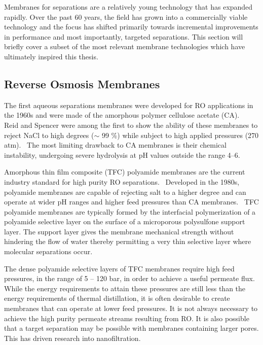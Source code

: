   Membranes for separations are a relatively young technology that has expanded
  rapidly. Over the past 60 years, the field has grown into a commercially viable
  technology and the focus has shifted primarily towards incremental improvements
  in performance and most importantly, targeted separations. This section will 
  briefly cover a subset of the most relevant membrane technologies which have 
  ultimately inspired this thesis.
  
  \subsection{Reverse Osmosis Membranes}
  
  The first aqueous separations membranes were developed for RO applications 
  in the 1960s and were made of the amorphous polymer cellulose acetate (CA).~\cite{kesting_semipermeable_1965}
  Reid and Spencer were among the first to show the ability of these membranes
  to reject NaCl to high degrees ($\sim$ 99 \%) while subject to high applied 
  pressures (270 atm).~\cite{reid_ultrafiltration_1960} The most limiting 
  drawback to CA membranes is their chemical instability, undergoing severe 
  hydrolysis at pH values outside the range 4--6.~\cite{vos_kinetic_1966}
  
  Amorphous thin film composite (TFC) polyamide membranes are the current industry 
  standard for high purity RO separations.~\cite{baker_membrane_2012} Developed 
  in the 1980s, polyamide membranes are capable of rejecting salt to a higher 
  degree and can operate at wider pH ranges and higher feed pressures than 
  CA membranes.~\cite{cadotte_interfacial_1981} TFC polyamide membranes are 
  typically formed by the interfacial polymerization of a polyamide selective 
  layer on the surface of a microporous polysulfone support layer. The support
  layer gives the membrane mechanical strength without hindering the flow of 
  water thereby permitting a very thin selective layer where molecular 
  separations occur.~\cite{kucera_biofouling_2019}
  
  The dense polyamide selective layers of TFC membranes require high feed pressures,
  in the range of 5 -- 120 bar, in order to achieve a useful permeate flux.~\cite{van_der_bruggen_review_2003}
  While the energy requirements to attain these pressures are still less than 
  the energy requirements of thermal distillation\cite{morton_environmental_1997}, it 
  is often desirable to create membranes that can operate at lower feed pressures.
  It is not always necessary to achieve the high purity permeate streams
  resulting from RO. It is also possible that a target separation may be possible with 
  membranes containing larger pores. This has driven research into nanofiltration.
  
